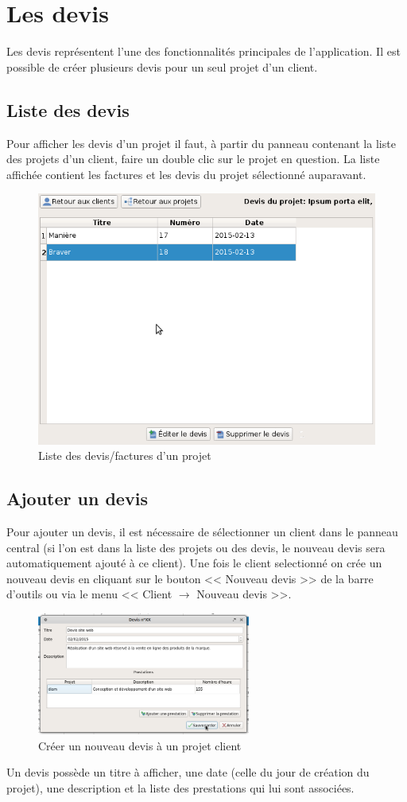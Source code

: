 \chapter{Les devis}
Les devis représentent l'une des fonctionnalités principales de l'application. Il est possible de créer plusieurs devis pour un seul projet d'un client. 
\section{Liste des devis}
Pour afficher les devis d'un projet il faut, à partir du panneau contenant la liste des projets d'un client, faire un double clic sur le projet en question. La liste affichée contient les factures et les devis du projet sélectionné auparavant.
\begin{figure}[H]
	\centering
	\includegraphics[width=12cm]{screens/ihmDevis.png}
	\caption{Liste des devis/factures d'un projet}
\end{figure}

\section{Ajouter un devis}
Pour ajouter un devis, il est nécessaire de sélectionner un client dans le panneau central (si l'on est dans la liste des projets ou des devis, le nouveau devis sera automatiquement ajouté à ce client). Une fois le client selectionné on crée un nouveau devis en cliquant sur le bouton << Nouveau devis >> de la barre d'outils ou via le menu << Client $\rightarrow$ Nouveau devis >>. 
\begin{figure}[H]
	\centering
	\includegraphics[width=7cm]{screens/creerDevis.png}
	\caption{Créer un nouveau devis à un projet client}
\end{figure}
Un devis possède un titre à afficher, une date (celle du jour de création du projet), une description et la liste des prestations qui lui sont associées.
